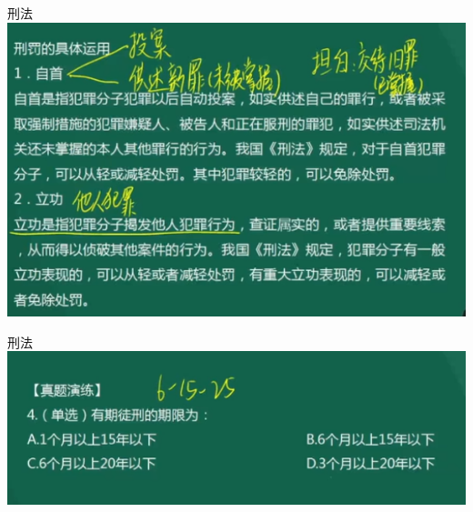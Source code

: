 \documentclass[aspectratio=169]{beamer}
\begin{document}
\begin{frame}[t]{刑法}
    \includegraphics[scale=0.6]{punishment_practice}\\ 
\end{frame}


\begin{frame}[t]{刑法}
    \includegraphics[scale=0.6]{punishment_question}\\ 
\end{frame}
\end{document}
